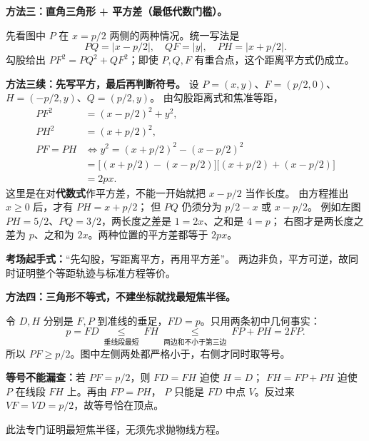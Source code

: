 \clearpage
\begin{proofbox}
\textbf{方法三：直角三角形 + 平方差（最低代数门槛）。}

先看图中 $P$ 在 $x=p/2$ 两侧的两种情况。统一写法是
\[
PQ=|x-p/2|,\quad QF=|y|,\quad PH=|x+p/2|.
\]
勾股给出 $PF^2=PQ^2+QF^2$；即使 $P,Q,F$ 有重合点，这个距离平方式仍成立。
\end{proofbox}
\clearpage
\begin{proofbox}
\textbf{方法三续：先写平方，最后再判断符号。}
设 $P=(x,y)$、$F=(p/2,0)$、$H=(-p/2,y)$、$Q=(p/2,y)$。
由勾股距离式和焦准等距，
\[
\begin{aligned}
PF^2&=(x-p/2)^2+y^2,\\
PH^2&=(x+p/2)^2,\\
PF=PH&\iff y^2=(x+p/2)^2-(x-p/2)^2\\
&=\bigl[(x+p/2)-(x-p/2)\bigr]
  \bigl[(x+p/2)+(x-p/2)\bigr]\\
&=\boxed{2px}.
\end{aligned}
\]
这里是在对\textbf{代数式}作平方差，不能一开始就把 $x-p/2$ 当作长度。
由方程推出 $x\ge0$ 后，才有 $PH=x+p/2$；
但 $PQ$ 仍须分为 $p/2-x$ 或 $x-p/2$。
例如左图 $PH=5/2$、$PQ=3/2$，两长度之差是 $1=2x$、之和是 $4=p$；
右图才是两长度之差为 $p$、之和为 $2x$。两种位置的平方差都等于 $2px$。

\medskip
\textbf{考场起手式：}“先勾股，写距离平方，再用平方差”。
两边非负，平方可逆，故同时证明整个等距轨迹与标准方程等价。
\end{proofbox}
\clearpage
\begin{proofbox}
\textbf{方法四：三角形不等式，不建坐标就找最短焦半径。}

令 $D,H$ 分别是 $F,P$ 到准线的垂足，$FD=p$。只用两条初中几何事实：
\[
p=FD\ \underset{\text{垂线段最短}}{\le}\ FH
\ \underset{\text{两边和不小于第三边}}{\le}\ FP+PH=2FP.
\]
所以 $\boxed{PF\ge p/2}$。图中左侧两处都严格小于，右侧才同时取等号。

\textbf{等号不能漏查：}若 $PF=p/2$，则 $FD=FH$ 迫使 $H=D$；
$FH=FP+PH$ 迫使 $P$ 在线段 $FH$ 上。再由 $FP=PH$，
$P$ 只能是 $FD$ 中点 $V$。反过来 $VF=VD=p/2$，故等号恰在顶点。

此法专门证明最短焦半径，无须先求抛物线方程。
\end{proofbox}
\clearpage
